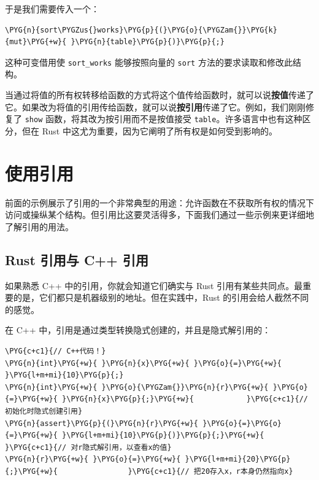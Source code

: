 于是我们需要传入一个：

\begin{Verbatim}[commandchars=\\\{\},breaklines=true,breakanywhere=true,fontsize=\codefont,xleftmargin=17bp]
\PYG{n}{sort\PYGZus{}works}\PYG{p}{(}\PYG{o}{\PYGZam{}}\PYG{k}{mut}\PYG{+w}{ }\PYG{n}{table}\PYG{p}{)}\PYG{p}{;}
\end{Verbatim}

这种可变借用使 \texttt{sort\_works} 能够按照向量的 \texttt{sort} 方法的要求读取和修改此结构。

当通过将值的所有权转移给函数的方式将这个值传给函数时，就可以说\textbf{按值}传递了它。如果改为将值的引用传给函数，就可以说\textbf{按引用}传递了它。例如，我们刚刚修复了 \texttt{show} 函数，将其改为按引用而不是按值接受 \texttt{table}。许多语言中也有这种区分，但在 Rust 中这尤为重要，因为它阐明了所有权是如何受到影响的。

\section{使用引用}

前面的示例展示了引用的一个非常典型的用途：允许函数在不获取所有权的情况下访问或操纵某个结构。但引用比这要灵活得多，下面我们通过一些示例来更详细地了解引用的用法。

\subsection{Rust 引用与 C++ 引用}

如果熟悉 C++ 中的引用，你就会知道它们确实与 Rust 引用有某些共同点。最重要的是，它们都只是机器级别的地址。但在实践中，Rust 的引用会给人截然不同的感觉。

在 C++ 中，引用是通过类型转换隐式创建的，并且是隐式解引用的：

\begin{Verbatim}[commandchars=\\\{\},breaklines=true,breakanywhere=true,fontsize=\codefont,xleftmargin=17bp]
\PYG{c+c1}{// C++代码！}
\PYG{n}{int}\PYG{+w}{ }\PYG{n}{x}\PYG{+w}{ }\PYG{o}{=}\PYG{+w}{ }\PYG{l+m+mi}{10}\PYG{p}{;}
\PYG{n}{int}\PYG{+w}{ }\PYG{o}{\PYGZam{}}\PYG{n}{r}\PYG{+w}{ }\PYG{o}{=}\PYG{+w}{ }\PYG{n}{x}\PYG{p}{;}\PYG{+w}{            }\PYG{c+c1}{// 初始化时隐式创建引用}
\PYG{n}{assert}\PYG{p}{(}\PYG{n}{r}\PYG{+w}{ }\PYG{o}{=}\PYG{o}{=}\PYG{+w}{ }\PYG{l+m+mi}{10}\PYG{p}{)}\PYG{p}{;}\PYG{+w}{       }\PYG{c+c1}{// 对r隐式解引用，以查看x的值}
\PYG{n}{r}\PYG{+w}{ }\PYG{o}{=}\PYG{+w}{ }\PYG{l+m+mi}{20}\PYG{p}{;}\PYG{+w}{                }\PYG{c+c1}{// 把20存入x，r本身仍然指向x}
\end{Verbatim}

